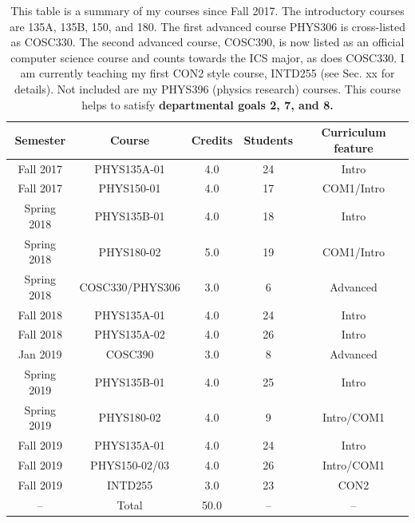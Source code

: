 \documentclass[../../../main.tex]{subfiles}
\begin{document}
\label{sec:courseDesc}

\begin{table}
\centering
\begin{tabular}{| c | c | c | c | c |}
\hline \hline
Semester & Course & Credits & Students & Curriculum feature \\ \hline
Fall 2017 & PHYS135A-01 & 4.0 & 24 & Intro \\ \hline
Fall 2017 & PHYS150-01 & 4.0 & 17 & COM1/Intro \\ \hline
Spring 2018 & PHYS135B-01 & 4.0 & 18 & Intro \\ \hline
Spring 2018 & PHYS180-02 & 5.0 & 19 & COM1/Intro \\ \hline
Spring 2018 & COSC330/PHYS306 & 3.0 & 6 & Advanced \\ \hline
Fall 2018 & PHYS135A-01 & 4.0 & 24 & Intro \\ \hline
Fall 2018 & PHYS135A-02 & 4.0 & 26 & Intro \\ \hline
Jan 2019 & COSC390 & 3.0 & 8 & Advanced \\ \hline
Spring 2019 & PHYS135B-01 & 4.0 & 25 & Intro \\ \hline
Spring 2019 & PHYS180-02 & 4.0 & 9 & Intro/COM1 \\ \hline
Fall 2019 & PHYS135A-01 & 4.0 & 24 & Intro \\ \hline
Fall 2019 & PHYS150-02/03 & 4.0 & 26 & Intro/COM1 \\ \hline
Fall 2019 & INTD255 & 3.0 & 23 & CON2 \\ \hline
-- & Total & 50.0 & -- & -- \\ \hline
\hline
\end{tabular}
\caption{\label{tab:courses:teaching} This table is a summary of my courses since Fall 2017.  The introductory courses are 135A, 135B, 150, and 180.  The first advanced course PHYS306 is cross-listed as COSC330. The second advanced course, COSC390, is now listed as an official computer science course and counts towards the ICS major, as does COSC330.  I am currently teaching my first CON2 style course, INTD255 (see Sec. xx for details). Not included are my PHYS396 (physics research) courses.  This course helps to satisfy \textbf{departmental goals 2, 7, and 8.}}
\end{table}
\end{document}
